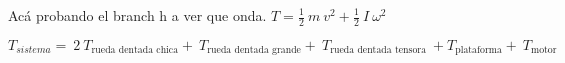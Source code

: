 \documentclass[12pt,a4paper]{article}
\begin{document}
\begin{landscape}
Acá probando el branch h a ver que onda.
$T = \frac{1}{2}~m~v^{2}+\frac{1}{2}~I~\omega^{2}$\\\vspace{0.8cm}

$T_{sistema}=~2~T_{\text{rueda dentada chica}}+~T_{\text{rueda dentada grande}}+~T_{\text{rueda dentada tensora}}~+T_{\text{plataforma}}+~T_{\text{motor}}$
\end{landscape}
%
%
%
%
%	
%	
\end{document}
